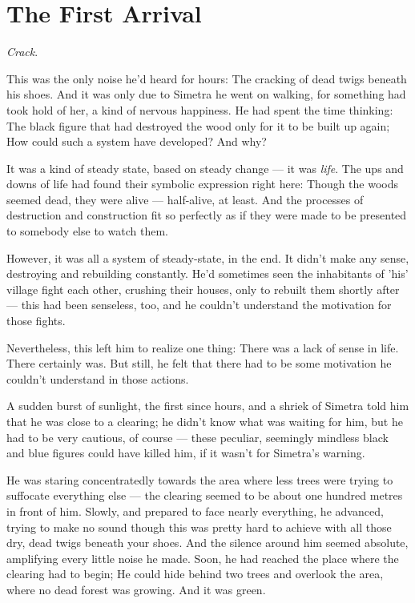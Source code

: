 \chapter{The First Arrival}
\label{cha:first-arrival}
\emph{Crack}.

This was the only noise he'd heard for hours: The cracking of dead twigs beneath his shoes. And it was only due to Simetra he went on walking, for something had took hold of her, a kind of nervous happiness. 
He had spent the time thinking: The black figure that had destroyed the wood only for it to be built up again; How could such a system have developed? And why?

It was a kind of steady state, based on steady change --- it was \emph{life}. The ups and downs of life had found their symbolic expression right here: Though the woods seemed dead, they were alive --- half-alive, at least. And the processes of destruction and construction fit so perfectly as if they were made to be presented to somebody else to watch them.

However, it was all a system of steady-state, in the end. It didn't make any sense, destroying and rebuilding constantly. He'd sometimes seen the inhabitants of 'his' village fight each other, crushing their houses, only to rebuilt them shortly after --- this had been senseless, too, and he couldn't understand the motivation for those fights.

Nevertheless, this left him to realize one thing: There was a lack of sense in life. 
There certainly was. 
But still, he felt that there had to be some motivation he couldn't understand in those actions. 

A sudden burst of sunlight, the first since hours, and a shriek of Simetra told him that he was close to a clearing; he didn't know what was waiting for him, but he had to be very cautious, of course --- these peculiar, seemingly mindless black and blue figures could have killed him, if it wasn't for Simetra's warning. 

He was staring concentratedly towards the area where less trees were trying to suffocate everything else --- the clearing seemed to be about one hundred metres in front of him. 
Slowly, and prepared to face nearly everything, he advanced, trying to make no sound though this was pretty hard to achieve with all those dry, dead twigs beneath your shoes. And the silence around him seemed absolute, amplifying every little noise he made.
Soon, he had reached the place where the clearing had to begin; He could hide behind two trees and overlook the area, where no dead forest was growing. And it was green.

